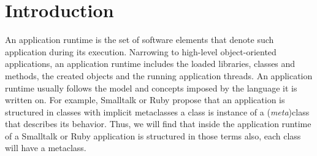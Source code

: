 
\chapter{Introduction}
\minitoc


%
%


An application runtime is the set of software elements that denote such application during its execution. Narrowing to high-level object-oriented applications, an application runtime includes \eg the loaded libraries, classes and methods, the created objects and the running application threads. An application runtime usually follows the model and concepts imposed by the language it is written on. For example, Smalltalk or Ruby propose that an application is structured in classes with implicit metaclasses \ie a class is instance of a (\emph{meta})class that describes its behavior. Thus, we will find that inside the application runtime of a Smalltalk or Ruby application is structured in those terms also, each class will have a metaclass. 

